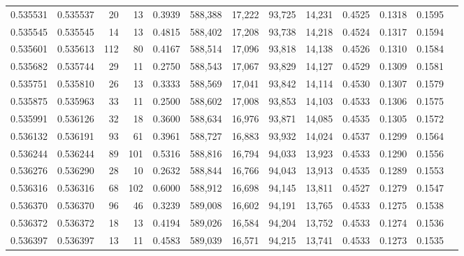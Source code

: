 \begin{tabular}{rrrrrrrrrrrrr}
0.535531 & 0.535537 &    20 &    13 &                                     0.3939 & 588,388 &  17,222 &  93,725 &  14,231 & 0.4525 & 0.1318 & 0.1595 \\
0.535545 & 0.535545 &    14 &    13 &                                     0.4815 & 588,402 &  17,208 &  93,738 &  14,218 & 0.4524 & 0.1317 & 0.1594 \\
0.535601 & 0.535613 &   112 &    80 &                                     0.4167 & 588,514 &  17,096 &  93,818 &  14,138 & 0.4526 & 0.1310 & 0.1584 \\
0.535682 & 0.535744 &    29 &    11 &                                     0.2750 & 588,543 &  17,067 &  93,829 &  14,127 & 0.4529 & 0.1309 & 0.1581 \\
0.535751 & 0.535810 &    26 &    13 &                                     0.3333 & 588,569 &  17,041 &  93,842 &  14,114 & 0.4530 & 0.1307 & 0.1579 \\
0.535875 & 0.535963 &    33 &    11 &                                     0.2500 & 588,602 &  17,008 &  93,853 &  14,103 & 0.4533 & 0.1306 & 0.1575 \\
0.535991 & 0.536126 &    32 &    18 &                                     0.3600 & 588,634 &  16,976 &  93,871 &  14,085 & 0.4535 & 0.1305 & 0.1572 \\
0.536132 & 0.536191 &    93 &    61 &                                     0.3961 & 588,727 &  16,883 &  93,932 &  14,024 & 0.4537 & 0.1299 & 0.1564 \\
0.536244 & 0.536244 &    89 &   101 &                                     0.5316 & 588,816 &  16,794 &  94,033 &  13,923 & 0.4533 & 0.1290 & 0.1556 \\
0.536276 & 0.536290 &    28 &    10 &                                     0.2632 & 588,844 &  16,766 &  94,043 &  13,913 & 0.4535 & 0.1289 & 0.1553 \\
0.536316 & 0.536316 &    68 &   102 &                                     0.6000 & 588,912 &  16,698 &  94,145 &  13,811 & 0.4527 & 0.1279 & 0.1547 \\
0.536370 & 0.536370 &    96 &    46 &                                     0.3239 & 589,008 &  16,602 &  94,191 &  13,765 & 0.4533 & 0.1275 & 0.1538 \\
0.536372 & 0.536372 &    18 &    13 &                                     0.4194 & 589,026 &  16,584 &  94,204 &  13,752 & 0.4533 & 0.1274 & 0.1536 \\
0.536397 & 0.536397 &    13 &    11 &                                     0.4583 & 589,039 &  16,571 &  94,215 &  13,741 & 0.4533 & 0.1273 & 0.1535 \\

\end{tabular}
